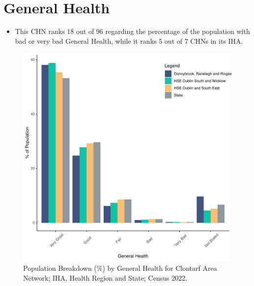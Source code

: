 \documentclass{article}
\begin{document}
\pagebreak

\section{General Health}\label{sect:GenHealth}
\begin{itemize}
\item  This CHN ranks  18 out of 96 regarding the percentage of the population with bad or very bad General Health, while it ranks   5 out of 7 CHNs in its IHA.
\end{itemize}
\begin{figure}[h]
	\centering
	\includegraphics[width = 150mm]{../figures/GenED.pdf}
	\caption{Population Breakdown (\%) by General Health for Clontarf Area Network; IHA, Health Region and State;  Census 2022.}
	\label{fig:2ae19629-1a6a-13a3-e055-000000000001}
	\end{figure}
\end{document}

